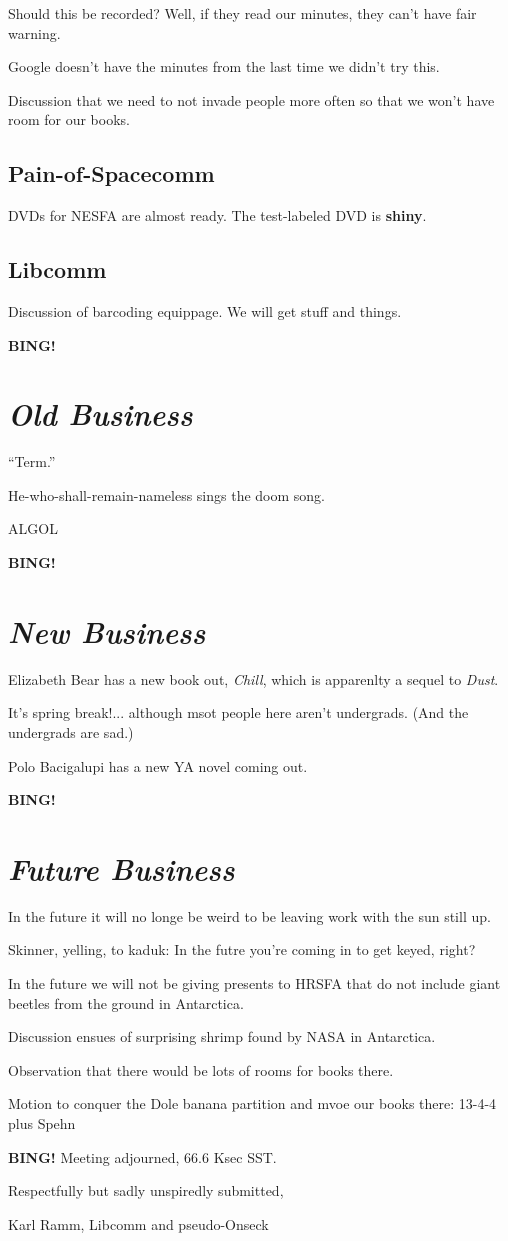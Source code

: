 \documentclass[10pt]{article}
\newcommand{\bing}{{\bf BING!} }
\newcommand{\goto}[1]{\bing \vskip 12pt \section*{{\em{#1}}}}
\newcommand{\ps}{ plus Spehn\xspace}
\newcommand{\onseck}{Karl Ramm, Libcomm and pseudo-Onseck}
\begin{document}
Should this be recorded?  Well, if they read our minutes, they can't have
fair warning.

Google doesn't have the minutes from the last time we didn't try this.

Discussion that we need to not invade people more often so that we won't have room for our
books.

\subsection*{Pain-of-Spacecomm}

DVDs for NESFA are almost ready.  The test-labeled DVD is {\bf shiny}.

\subsection*{Libcomm}

Discussion of barcoding equippage.  We will get stuff and things.

\goto{Old Business}

``Term.''

He-who-shall-remain-nameless sings the doom song.

ALGOL

\goto{New Business}

Elizabeth Bear has a new book out, {\it Chill}, which is apparenlty a
sequel to {\it Dust}.

It's spring break!... although msot people here aren't undergrads.  (And
the undergrads are sad.)

Polo Bacigalupi has a new YA novel coming out.

\goto{Future Business}

In the future it will no longe be weird to be leaving work with the sun
still up.

Skinner, yelling, to kaduk: In the futre you're coming in to get keyed,
right?

In the future we will not be giving presents to HRSFA that do not include
giant beetles from the ground in Antarctica.

Discussion ensues of surprising shrimp found by NASA in Antarctica.

Observation that there would be lots of rooms for books there.

Motion to conquer the Dole banana partition and mvoe our books there:
13-4-4 \ps

\bing
\noindent
Meeting adjourned, 66.6 Ksec SST.

\vspace{18pt}

\centerline{Respectfully but sadly unspiredly submitted,}
\centerline{\onseck}
\end{document}

